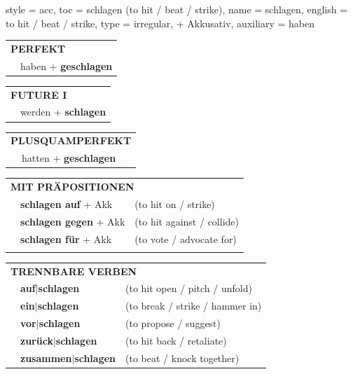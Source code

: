 \begin{verbentry}{
  style = {acc},
  toc = {schlagen (to hit / beat / strike)},
  name = {schlagen},
  english = {to hit / beat / strike},
  type = {irregular, + Akkusativ},
  auxiliary = {haben}
}
 \begin{tabular}{rl}
     \multicolumn{2}{l}{\textbf{PERFEKT}}\\
   & haben + \textbf{geschlagen}\\
  \end{tabular}
\hfill
\begin{tabular}{rl}
    \multicolumn{2}{l}{\textbf{FUTURE I}}\\
   & werden + \textbf{schlagen}\\
  \end{tabular}
\hfill
\begin{tabular}{rl}
    \multicolumn{2}{l}{\textbf{PLUSQUAMPERFEKT}}\\
   & hatten + \textbf{geschlagen}\\
  \end{tabular}

 \vspace{10pt}

\begin{tabular}{lll}
      \multicolumn{3}{l}{\textbf{MIT PRÄPOSITIONEN}}\\
& \textbf{schlagen auf} + Akk & (to hit on / strike)\\
& \textbf{schlagen gegen} + Akk & (to hit against / collide)\\
& \textbf{schlagen für} + Akk & (to vote / advocate for)\\
\vspace{20pt}
\end{tabular}
  \hfill
\begin{tabular}{lll}
      \multicolumn{3}{l}{\textbf{TRENNBARE VERBEN}}\\
 & \textbf{auf$|$schlagen} & (to hit open / pitch / unfold)\\
 & \textbf{ein$|$schlagen} & (to break / strike / hammer in)\\
 & \textbf{vor$|$schlagen} & (to propose / suggest)\\
 & \textbf{zurück$|$schlagen} & (to hit back / retaliate)\\
 & \textbf{zusammen$|$schlagen} & (to beat / knock together)\\
  \end{tabular}

  \vspace{-5pt}
\end{verbentry}

